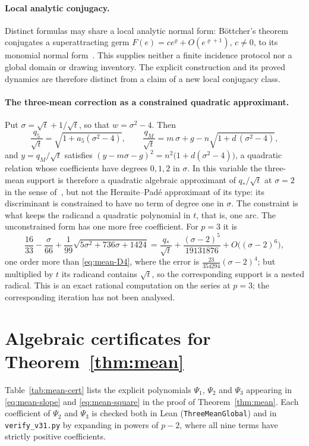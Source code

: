 \paragraph{Local analytic conjugacy.}
Distinct formulas may share a local analytic normal form: B\"ottcher's theorem conjugates a
superattracting germ $F(e)=ce^{\varrho}+O(e^{\varrho+1})$, $c\neq0$, to its monomial normal form~\cite{buff}. This
supplies neither a finite incidence protocol nor a global domain or drawing inventory. The explicit
construction and its proved dynamics are therefore distinct from a claim of a new local conjugacy class.

\paragraph{The three-mean correction as a constrained quadratic approximant.}
Put $\sigma=\sqrt t+1/\sqrt t$, so that $w=\sigma^{2}-4$. Then
\[ \frac{q_5}{\sqrt t}=\sqrt{1+a_5(\sigma^{2}-4)},\qquad
\frac{q_M}{\sqrt t}=m\,\sigma+g-n\sqrt{1+d\,(\sigma^{2}-4)} , \]
and $y=q_M/\sqrt t$ satisfies $(y-m\sigma-g)^{2}=n^{2}\bigl(1+d(\sigma^{2}-4)\bigr)$, a quadratic
relation whose coefficients have degrees $0,1,2$ in $\sigma$. In this variable the three-mean support
is therefore a quadratic algebraic approximant of $q_*/\sqrt t$ at $\sigma=2$ in the sense
of~\cite{shafer}, but not the Hermite--Pad\'e approximant of its type: its discriminant is constrained to
have no term of degree one in $\sigma$. The constraint is what keeps the radicand a quadratic
polynomial in $t$, that is, one arc. The unconstrained form has one more free coefficient. For $p=3$
it is
\[ \frac{16}{33}-\frac{\sigma}{66}+\frac1{99}\sqrt{5\sigma^{2}+736\sigma+1424}
=\frac{q_*}{\sqrt t}+\frac{(\sigma-2)^{5}}{19131876}+O\bigl((\sigma-2)^{6}\bigr), \]
one order more than \eqref{eq:mean-D4}, where the error is $\tfrac{23}{354294}(\sigma-2)^{4}$; but
multiplied by $t$ its radicand contains $\sqrt t$, so the corresponding support is a nested radical.
This is an exact rational computation on the series at $p=3$; the corresponding iteration has not been
analysed.

\FloatBarrier
\section{Algebraic certificates for Theorem~\ref{thm:mean}}\label{app:certs}

Table~\ref{tab:mean-cert} lists the explicit polynomials $\Psi_1$, $\Psi_2$ and $\Psi_3$ appearing in
\eqref{eq:mean-slope} and \eqref{eq:mean-square} in the proof of Theorem~\ref{thm:mean}. Each coefficient
of $\Psi_2$ and $\Psi_3$ is checked both in Lean (\texttt{ThreeMeanGlobal}) and in \texttt{verify\_v31.py}
by expanding in powers of $p-2$, where all nine terms have strictly positive coefficients.

